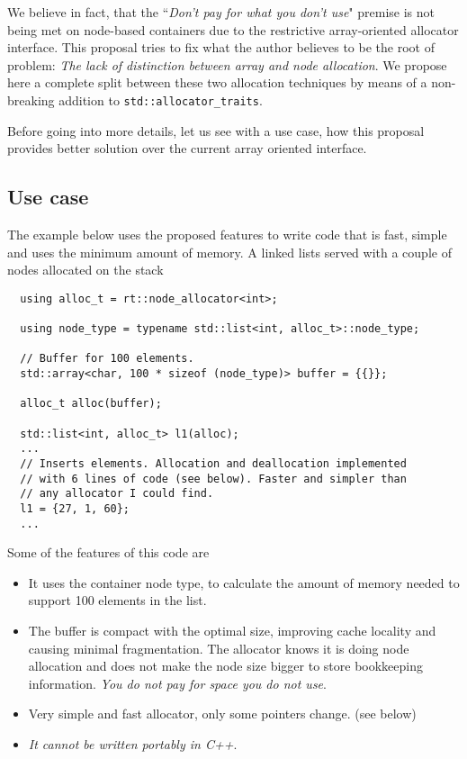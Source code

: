 \documentclass[11pt]{article}
\begin{document}
We believe in fact, that the ``{\it Don't pay for what you don't use}" premise
is not being met on node-based containers due to the restrictive
array-oriented allocator interface. This proposal tries to fix what the author
believes to be the root of problem: {\it The lack of distinction between array
and node allocation}.  We propose here a complete split between these two
allocation techniques by means of a non-breaking addition to
\texttt{std::allocator\_traits}.

Before going into more details, let us see with a use case,
how this proposal provides better solution over the current
array oriented interface.

\subsection{Use case}
The example below uses the proposed features
to write code that is fast, simple and uses the minimum
amount of memory. A linked lists served with a couple of nodes
allocated on the stack
\medskip
\begin{lstlisting}
  using alloc_t = rt::node_allocator<int>;

  using node_type = typename std::list<int, alloc_t>::node_type;

  // Buffer for 100 elements.
  std::array<char, 100 * sizeof (node_type)> buffer = {{}};

  alloc_t alloc(buffer);

  std::list<int, alloc_t> l1(alloc);
  ...
  // Inserts elements. Allocation and deallocation implemented
  // with 6 lines of code (see below). Faster and simpler than
  // any allocator I could find.
  l1 = {27, 1, 60};
  ...
\end{lstlisting}

\newpage
Some of the features of this code are
\begin{itemize}

\item It uses the container node type, to calculate the amount of memory needed
to support 100 elements in the list.

\item The buffer is compact with the optimal size, improving
cache locality and causing minimal fragmentation. The allocator
knows it is doing node allocation and does not make the node size bigger to
store bookkeeping information.
{\it You do not pay for space you do not use}.
\item Very simple and fast allocator, only some pointers change. (see below)
\item {\it It cannot be written portably in C++}.
\end{itemize}
\end{document}
